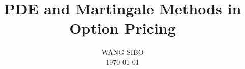 \documentclass[multixcb, 14pt]{amstext-l}
\theoremstyle{plain}
\theoremstyle{definition}
\begin{document}
\frontmatter

\makeatletter

\makeatother

\title{PDE and Martingale Methods in Option Pricing}
\author{WANG SIBO\\ \today}

\maketitle

\tableofcontents

\mainmatter

\chapter{}
\chapter{}
\chapter{}
\chapter{}
\chapter{}
\chapter{}
\chapter{}
\chapter{}
\chapter{}
\chapter{}
\chapter{}
\chapter{}
\chapter{}
\chapter{}
\chapter{}


\end{document}
